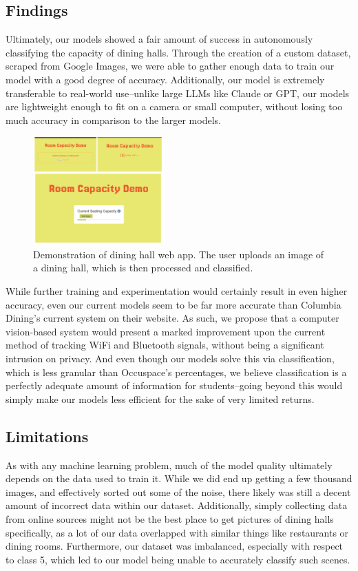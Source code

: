 \documentclass{article}
\begin{document}
\begin{multicols}{2}
\subsection*{Findings}
Ultimately, our models showed a fair amount of success in autonomously classifying the capacity of dining halls. Through the creation of a custom dataset, scraped from Google Images, we were able to gather enough data to train our model with a good degree of accuracy. Additionally, our model is extremely transferable to real-world use–unlike large LLMs like Claude or GPT, our models are lightweight enough to fit on a camera or small computer, without losing too much accuracy in comparison to the larger models.
\begin{figure}[H]
  \centering
  \includegraphics[width=0.45\textwidth]{webapp.png}
  \caption{Demonstration of dining hall web app. The user uploads an image of a dining hall, which is then processed and classified.}
  \label{fig:fig8}
\end{figure}
While further training and experimentation would certainly result in even higher accuracy, even our current models seem to be far more accurate than Columbia Dining’s current system on their website. As such, we propose that a computer vision-based system would present a marked improvement upon the current method of tracking WiFi and Bluetooth signals, without being a significant intrusion on privacy. And even though our models solve this via classification, which is less granular than Occuspace’s percentages, we believe classification is a perfectly adequate amount of information for students–going beyond this would simply make our models less efficient for the sake of very limited returns.

\subsection*{Limitations}
As with any machine learning problem, much of the model quality ultimately depends on the data used to train it. While we did end up getting a few thousand images, and effectively sorted out some of the noise, there likely was still a decent amount of incorrect data within our dataset. Additionally, simply collecting data from online sources might not be the best place to get pictures of dining halls specifically, as a lot of our data overlapped with similar things like restaurants or dining rooms. Furthermore, our dataset was imbalanced, especially with respect to class 5, which led to our model being unable to accurately classify such scenes.


\end{multicols}
\end{document}
